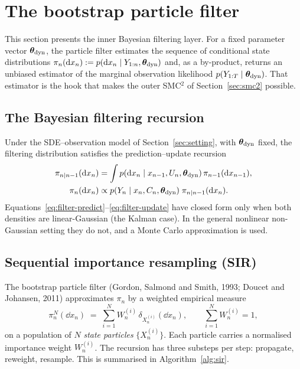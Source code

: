 \section{The bootstrap particle filter} \label{sec:pf}

This section presents the inner Bayesian filtering layer. For a fixed
parameter vector $\bm{\theta}_{\rm dyn}$, the particle filter estimates the
sequence of conditional state distributions
$\pi_n(\mathrm{d} x_n) := p(\mathrm{d} x_n \mid Y_{1:n}, \bm{\theta}_{\rm dyn})$ and, as a
by-product, returns an unbiased estimator of the marginal observation
likelihood $p(Y_{1:T} \mid \bm{\theta}_{\rm dyn})$. That estimator is the hook
that makes the outer SMC$^2$ of Section~\ref{sec:smc2} possible.

\subsection{The Bayesian filtering recursion}

Under the SDE--observation model of Section~\ref{sec:setting}, with
$\bm{\theta}_{\rm dyn}$ fixed, the filtering distribution satisfies the
prediction--update recursion
\begin{align}
\pi_{n \mid n-1}(\mathrm{d} x_n)
   &= \int p(\mathrm{d} x_n \mid x_{n-1}, U_n, \bm{\theta}_{\rm dyn})\,
            \pi_{n-1}(\mathrm{d} x_{n-1}),
   \label{eq:filter-predict} \\
\pi_n(\mathrm{d} x_n)
   &\propto p(Y_n \mid x_n, C_n, \bm{\theta}_{\rm dyn})\;
            \pi_{n \mid n-1}(\mathrm{d} x_n).
   \label{eq:filter-update}
\end{align}
Equations~\eqref{eq:filter-predict}--\eqref{eq:filter-update} have
closed form only when both densities are linear-Gaussian (the Kalman
case). In the general nonlinear non-Gaussian setting they do not, and
a Monte Carlo approximation is used.

\subsection{Sequential importance resampling (SIR)}

The bootstrap particle filter (Gordon, Salmond and Smith, 1993; Doucet
and Johansen, 2011) approximates $\pi_n$ by a weighted empirical
measure
\begin{equation}
\pi_n^N(\dd x_n) \;=\; \sum_{i=1}^{N} W_n^{(i)}\,
                        \delta_{X_n^{(i)}}(\dd x_n),
\qquad \sum_{i=1}^{N} W_n^{(i)} = 1,
\end{equation}
on a population of $N$ \emph{state particles} $\{X_n^{(i)}\}$. Each
particle carries a normalised importance weight $W_n^{(i)}$. The
recursion has three substeps per step: propagate, reweight, resample.
This is summarised in Algorithm~\ref{alg:sir}.

